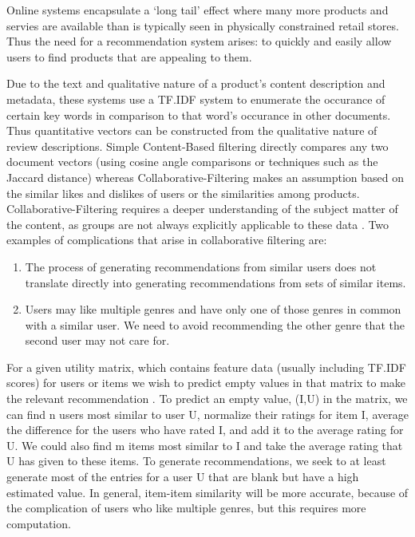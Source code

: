 \documentclass[11pt]{article}
\begin{document}
Online systems encapsulate a `long tail' effect \cite{chapter9} where many more products and servies are available than is typically seen in physically constrained retail stores. Thus the need for a recommendation system arises: to quickly and easily allow users to find products that are appealing to them.
\par Due to the text and qualitative nature of a product's content description and metadata, these systems use a TF.IDF \cite{beginners_guide} system to enumerate the occurance of certain key words in comparison to that word's occurance in other documents. Thus quantitative vectors can be constructed from the qualitative nature of review descriptions. Simple Content-Based filtering directly compares any two document vectors (using cosine angle comparisons or techniques such as the Jaccard distance) \cite{chapter9} whereas Collaborative-Filtering makes an assumption based on the similar likes and dislikes of users or the similarities among products. Collaborative-Filtering requires a deeper understanding of the subject matter of the content, as groups are not always explicitly applicable to these data \cite{chapter9}. Two examples of complications that arise in collaborative filtering are:
\begin{enumerate}
		\item The process of generating recommendations from similar users does not translate directly into generating recommendations from sets of similar items.
		\item Users may like multiple genres and have only one of those genres in common with a similar user. We need to avoid recommending the other genre that the second user may not care for.
\end{enumerate}
\par For a given utility matrix, which contains feature data (usually including TF.IDF scores) for users or items we wish to predict empty values in that matrix to make the relevant recommendation \cite{chapter9}. To predict an empty value, (I,U) in the matrix, we can find n users most similar to user U, normalize their ratings for item I, average the difference for the users who have rated I, and add it to the average rating for U. We could also find m items most similar to I and take the average rating that U has given to these items. To generate recommendations, we seek to at least generate most of the entries for a user U that are blank but have a high estimated value. In general, item-item similarity will be more accurate, because of the complication of users who like multiple genres, but this requires more computation.
\end{document}
